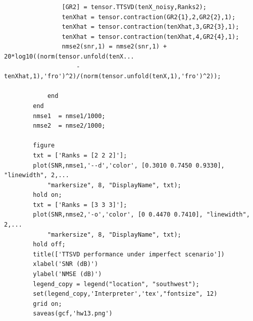 \documentclass[a4paper,10pt]{article}
\begin{document}
\begin{verbatim}
                [GR2] = tensor.TTSVD(tenX_noisy,Ranks2);
                tenXhat = tensor.contraction(GR2{1},2,GR2{2},1);
                tenXhat = tensor.contraction(tenXhat,3,GR2{3},1);
                tenXhat = tensor.contraction(tenXhat,4,GR2{4},1);
                nmse2(snr,1) = nmse2(snr,1) + 20*log10((norm(tensor.unfold(tenX... 
                    - tenXhat,1),'fro')^2)/(norm(tensor.unfold(tenX,1),'fro')^2));
                
            end
        end
        nmse1  = nmse1/1000;
        nmse2  = nmse2/1000;

        figure
        txt = ['Ranks = [2 2 2]'];
        plot(SNR,nmse1,'--d','color', [0.3010 0.7450 0.9330], "linewidth", 2,...
            "markersize", 8, "DisplayName", txt);
        hold on;
        txt = ['Ranks = [3 3 3]'];
        plot(SNR,nmse2,'-o','color', [0 0.4470 0.7410], "linewidth", 2,...
            "markersize", 8, "DisplayName", txt);
        hold off;
        title(['TTSVD performance under imperfect scenario'])
        xlabel('SNR (dB)')
        ylabel('NMSE (dB)')
        legend_copy = legend("location", "southwest");
        set(legend_copy,'Interpreter','tex',"fontsize", 12)
        grid on;
        saveas(gcf,'hw13.png')
    \end{verbatim}
    
%
%
\end{document}
